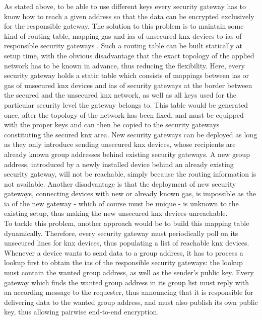 As stated above, to be able to use different keys every security gateway has to know how to reach a given address so that the data can be encrypted
exclusively for the responsible gateway. The solution to this problem is to maintain some kind of routing table, mapping \glspl{ga} and \glspl{ia} of unsecured
\gls{knx} devices to \glspl{ia} of responsible security gateways	.
Such a routing table can be built statically at setup time, with the obvious disadvantage
that the exact topology of the applied network has to be known in advance, thus reducing the flexibility. Here, every security gateway holds a static 
table which consists of mappings between \glspl{ia} or \glspl{ga} of unsecured \gls{knx} devices and \glspl{ia} of security gateways at the border
between the secured and the unsecured \gls{knx} network, as well as all keys used for the particular security level the gateway belongs to.
This table would be generated once, after the topology of the network has been fixed, and must be equipped with the proper keys and can then
be copied to the security gateways constituting the secured \gls{knx} area. New security gateways can be deployed as long as they only introduce sending 
unsecured \gls{knx} devices, whose recipients are already known group addresses behind existing security gateways. A new group address, introduced by a newly installed device behind
an already existing security gateway, will not be reachable, simply because the routing information is not available. 
Another disadvantage is that the deployment of new
security gateways, connecting devices with new or already known \glspl{ga}, is impossible as the \gls{ia} of the new gateway - which of
course must be unique - is unknown to the existing setup, thus making the new unsecured \gls{knx} devices unreachable.
\\
To tackle this problem, another approach would be to build this mapping table dynamically. Therefore, every security gateway must periodically poll
on its unsecured lines for \gls{knx} devices, thus populating a list of reachable \gls{knx} devices. Whenever a 
device wants to send data to a group address, it has to process a lookup first to obtain the \glspl{ia} of the responsible security gateways: the lookup
must contain the wanted group address, as well as the sender's public key.
Every 
gateway which finds the wanted group address in its group list must reply with an according message to the requester, thus announcing that it is responsible
for delivering data to the wanted group address, and must also publish its own public key, thus allowing pairwise end-to-end encryption.
